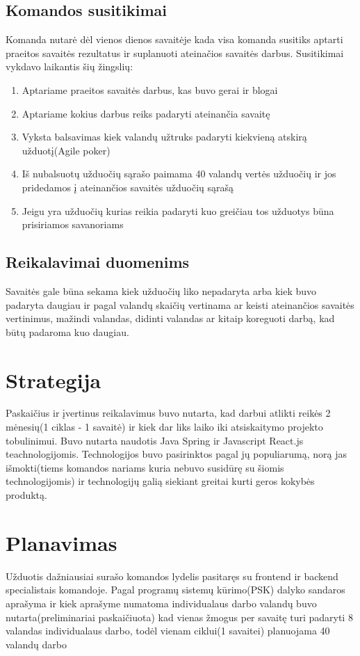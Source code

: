 \documentclass{VUMIFInfKursinis}
\begin{document}
	\subsection{Komandos susitikimai}
	Komanda nutarė dėl vienos dienos savaitėje kada visa komanda susitiks aptarti praeitos savaitės rezultatus ir suplanuoti ateinačios savaitės darbus. Susitikimai vykdavo laikantis šių žingslių:
		\begin{enumerate}
			\item{Aptariame praeitos savaitės darbus, kas buvo gerai ir blogai}
			\item{Aptariame kokius darbus reiks padaryti ateinančia savaitę}
			\item{Vyksta balsavimas kiek valandų užtruks padaryti kiekvieną atskirą užduotį(Agile poker)}
			\item{Iš nubalsuotų užduočių sąrašo paimama 40 valandų vertės užduočių ir jos pridedamos į ateinančios savaitės užduočių sąrašą}
			\item{Jeigu yra užduočių kurias reikia padaryti kuo greičiau tos užduotys būna prisiriamos savanoriams}
		\end{enumerate}
	\subsection{Reikalavimai duomenims}
	Savaitės gale būna sekama kiek užduočių liko nepadaryta arba kiek buvo padaryta daugiau ir pagal valandų skaičių vertinama ar keisti ateinančios savaitės vertinimus, mažindi valandas, didinti valandas ar kitaip koreguoti darbą, kad būtų padaroma kuo daugiau.
\section{Strategija}
Paskaičius ir įvertinus reikalavimus buvo nutarta, kad darbui atlikti reikės 2 mėnesių(1 ciklas - 1 savaitė) ir kiek dar liks laiko iki atsiskaitymo projekto tobulinimui. Buvo nutarta naudotis Java Spring ir Javascript React.js teachnologijomis. Technologijos buvo pasirinktos pagal jų populiarumą, norą jas išmokti(tiems komandos nariams kuria nebuvo susidūrę su šiomis technologijomis) ir technologijų galią siekiant greitai kurti geros kokybės produktą.
\section{Planavimas} 
Užduotis dažniausiai surašo komandos lydelis pasitaręs su frontend ir backend specialistais komandoje. Pagal programų sistemų kūrimo(PSK) dalyko sandaros aprašyma ir kiek aprašyme numatoma individualaus darbo valandų buvo nutarta(preliminariai paskaičiuota) kad vienas žmogus per savaitę turi padaryti 8 valandas individualaus darbo, todėl vienam ciklui(1 savaitei) planuojama 40 valandų darbo
\end{document}
